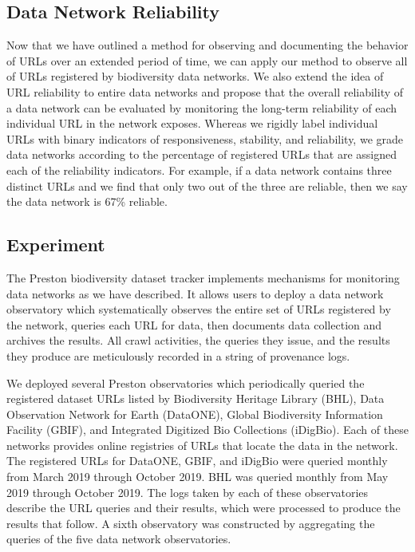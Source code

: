 \subsection*{Data Network Reliability}

Now that we have outlined a method for observing and documenting the behavior of URLs over an extended period of time, we can apply our method to observe all of URLs registered by biodiversity data networks. We also extend the idea of URL reliability to entire data networks and propose that the overall reliability of a data network can be evaluated by monitoring the long-term reliability of each individual URL in the network exposes. Whereas we rigidly label individual URLs with binary indicators of responsiveness, stability, and reliability, we grade data networks according to the percentage of registered URLs that are assigned each of the reliability indicators. For example, if a data network contains three distinct URLs and we find that only two out of the three are reliable, then we say the data network is 67\% reliable.

\subsection*{Experiment}

The Preston biodiversity dataset tracker \citep{jorrit_poelen_2018_1410543} implements mechanisms for monitoring data networks as we have described. It allows users to deploy a data network observatory which systematically observes the entire set of URLs registered by the network, queries each URL for data, then documents data collection and archives the results. All crawl activities, the queries they issue, and the results they produce are meticulously recorded in a string of provenance logs.

We deployed several Preston observatories which periodically queried the registered dataset URLs listed by Biodiversity Heritage Library (BHL), Data Observation Network for Earth (DataONE), Global Biodiversity Information Facility (GBIF), and Integrated Digitized Bio Collections (iDigBio). Each of these networks provides online registries of URLs that locate the data in the network. The registered URLs for DataONE, GBIF, and iDigBio were queried monthly from March 2019 through October 2019. BHL was queried monthly from May 2019 through October 2019. The logs taken by each of these observatories describe the URL queries and their results, which were processed to produce the results that follow. A sixth observatory was constructed by aggregating the queries of the five data network observatories.

